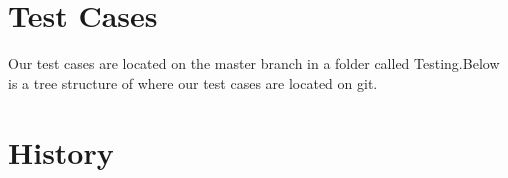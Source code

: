 \documentclass[12pt]{article}
\begin{document}
	
	\section{Test Cases}
	Our test cases are located on the master branch in a folder called Testing.Below is a tree structure of where our test cases are located on git.
	
	\section{History}
	
	
	
	
	
	
	
	
	
	
\end{document}
